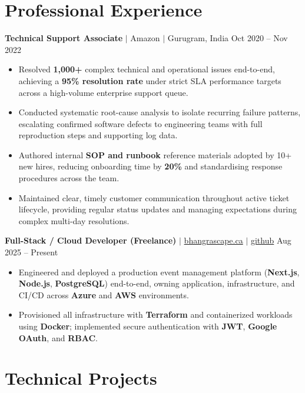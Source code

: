 \documentclass[11pt,a4paper]{article}
\begin{document}
\section{Professional Experience}

\textbf{Technical Support Associate} $|$ Amazon $|$ Gurugram, India \hfill Oct 2020 -- Nov 2022
\begin{itemize}
    \item Resolved \textbf{1,000+} complex technical and operational issues end-to-end, achieving a \textbf{95\% resolution rate} under strict SLA performance targets across a high-volume enterprise support queue.
    \item Conducted systematic root-cause analysis to isolate recurring failure patterns, escalating confirmed software defects to engineering teams with full reproduction steps and supporting log data.
    \item Authored internal \textbf{SOP and runbook} reference materials adopted by 10+ new hires, reducing onboarding time by \textbf{20\%} and standardising response procedures across the team.
    \item Maintained clear, timely customer communication throughout active ticket lifecycle, providing regular status updates and managing expectations during complex multi-day resolutions.
\end{itemize}

\vspace{4pt}

\textbf{Full-Stack / Cloud Developer (Freelance)} $|$ \href{https://bhangrascape.ca}{bhangrascape.ca} $|$ \href{https://github.com/bhat0155/bhangraescape}{\small github} \hfill Aug 2025 -- Present
\begin{itemize}
    \item Engineered and deployed a production event management platform (\textbf{Next.js}, \textbf{Node.js}, \textbf{PostgreSQL}) end-to-end, owning application, infrastructure, and CI/CD across \textbf{Azure} and \textbf{AWS} environments.
    \item Provisioned all infrastructure with \textbf{Terraform} and containerized workloads using \textbf{Docker}; implemented secure authentication with \textbf{JWT}, \textbf{Google OAuth}, and \textbf{RBAC}.
\end{itemize}

\section{Technical Projects}
\end{document}
